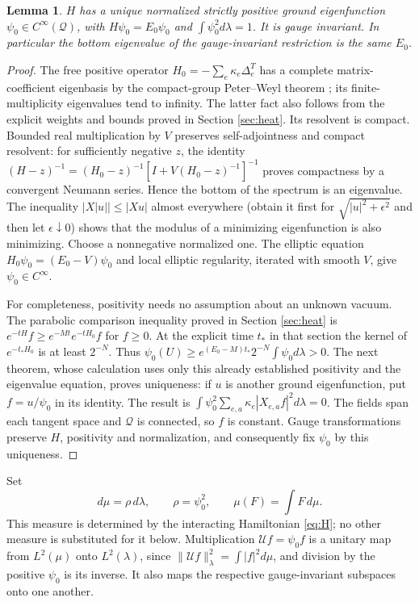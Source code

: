 \documentclass[11pt]{article}
\newtheorem{lemma}[theorem]{Lemma}
\theoremstyle{definition}
\begin{document}
\begin{lemma}\label{lem:ground}
$H$ has a unique normalized strictly positive ground eigenfunction
$\psi_0\in C^\infty(\mathcal Q)$, with $H\psi_0=E_0\psi_0$ and
$\int\psi_0^2d\lambda=1$. It is gauge invariant. In particular the bottom
eigenvalue of the gauge-invariant restriction is the same $E_0$.
\end{lemma}
\begin{proof}
The free positive operator $H_0=-\sum_e\kappa_e\Delta_e^T$ has a complete
matrix-coefficient eigenbasis by the compact-group Peter--Weyl theorem
\cite{PeterWeyl}; its finite-multiplicity eigenvalues tend to infinity.
The latter fact also follows from the explicit weights and bounds proved
in Section \ref{sec:heat}. Its resolvent is compact. Bounded real
multiplication by $V$ preserves self-adjointness and compact resolvent:
for sufficiently negative $z$, the identity
$(H-z)^{-1}=(H_0-z)^{-1}[I+V(H_0-z)^{-1}]^{-1}$ proves compactness by a
convergent Neumann series. Hence the bottom of the spectrum is an
eigenvalue. The inequality $|X|u||\leq|Xu|$ almost everywhere (obtain it
first for $\sqrt{|u|^2+\epsilon^2}$ and then let $\epsilon\downarrow0$)
shows that the modulus of a minimizing eigenfunction is also minimizing.
Choose a nonnegative normalized one. The elliptic equation
$H_0\psi_0=(E_0-V)\psi_0$ and local elliptic regularity, iterated with
smooth $V$, give $\psi_0\in C^\infty$.

For completeness, positivity needs no assumption about an unknown vacuum.
The parabolic comparison inequality proved in Section \ref{sec:heat} is
$e^{-tH}f\geq e^{-Mt}e^{-tH_0}f$ for $f\geq0$.
At the explicit time $t_*$ in that section the kernel of $e^{-t_*H_0}$
is at least $2^{-N}$. Thus
$\psi_0(U)\geq e^{(E_0-M)t_*}2^{-N}\int\psi_0d\lambda>0$.
The next theorem, whose calculation uses only this already established
positivity and the eigenvalue equation, proves uniqueness: if $u$ is
another ground eigenfunction, put $f=u/\psi_0$ in its identity. The
result is $\int\psi_0^2\sum_{e,a}\kappa_e|X_{e,a}f|^2d\lambda=0$.
The fields span each tangent space and $\mathcal Q$ is connected, so
$f$ is constant. Gauge transformations preserve $H$, positivity and
normalization, and consequently fix $\psi_0$ by this uniqueness.
\end{proof}

Set
\begin{equation}\label{eq:vacuummeasure}
 d\mu=\rho\,d\lambda,\qquad \rho=\psi_0^2,
 \qquad \mu(F)=\int F\,d\mu.
\end{equation}
This measure is determined by the interacting Hamiltonian
\eqref{eq:H}; no other measure is substituted for it below.
Multiplication $\mathcal U f=\psi_0 f$ is a unitary map from
$L^2(\mu)$ onto $L^2(\lambda)$, since
$\|\mathcal U f\|_\lambda^2=\int|f|^2d\mu$, and division by the positive
$\psi_0$ is its inverse. It also maps the respective gauge-invariant
subspaces onto one another.
\end{document}
